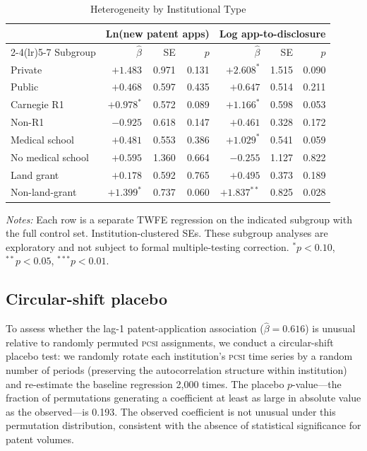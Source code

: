 \documentclass[12pt]{article}
\newcommand{\PCSI}{\textsc{pcsi}}
\begin{document}
\begin{table}[htbp]
\centering
\caption{Heterogeneity by Institutional Type}
\label{tab:het}
\begin{threeparttable}
\begin{tabular}{lrrrrrr}
\toprule
 & \multicolumn{3}{c}{Ln(new patent apps)} & \multicolumn{3}{c}{Log app-to-disclosure} \\
\cmidrule(lr){2-4}\cmidrule(lr){5-7}
Subgroup & $\hat\beta$ & SE & $p$ & $\hat\beta$ & SE & $p$ \\
\midrule
Private & $+1.483$ & 0.971 & 0.131 & $+2.608^*$ & 1.515 & 0.090 \\
Public & $+0.468$ & 0.597 & 0.435 & $+0.647$ & 0.514 & 0.211 \\
Carnegie R1 & $+0.978^*$ & 0.572 & 0.089 & $+1.166^*$ & 0.598 & 0.053 \\
Non-R1 & $-0.925$ & 0.618 & 0.147 & $+0.461$ & 0.328 & 0.172 \\
Medical school & $+0.481$ & 0.553 & 0.386 & $+1.029^*$ & 0.541 & 0.059 \\
No medical school & $+0.595$ & 1.360 & 0.664 & $-0.255$ & 1.127 & 0.822 \\
Land grant & $+0.178$ & 0.592 & 0.765 & $+0.495$ & 0.373 & 0.189 \\
Non-land-grant & $+1.399^*$ & 0.737 & 0.060 & $+1.837^{**}$ & 0.825 & 0.028 \\
\bottomrule
\end{tabular}
\begin{tablenotes}
\small
\item \textit{Notes:} Each row is a separate TWFE regression on the indicated subgroup
with the full control set. Institution-clustered SEs. These subgroup analyses are
exploratory and not subject to formal multiple-testing correction.
$^*p<0.10$, $^{**}p<0.05$, $^{***}p<0.01$.
\end{tablenotes}
\end{threeparttable}
\end{table}

\subsection{Circular-shift placebo}

To assess whether the lag-1 patent-application association ($\hat\beta=0.616$) is
unusual relative to randomly permuted \PCSI{} assignments, we conduct a circular-shift
placebo test: we randomly rotate each institution's \PCSI{} time series by a random
number of periods (preserving the autocorrelation structure within institution) and
re-estimate the baseline regression 2,000 times. The placebo $p$-value---the fraction
of permutations generating a coefficient at least as large in absolute value as the
observed---is 0.193. The observed coefficient is not unusual under this permutation
distribution, consistent with the absence of statistical significance for patent volumes.
\end{document}
